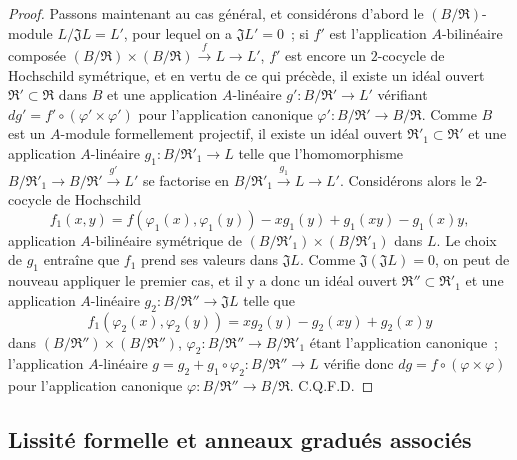 \begin{proof}
Passons maintenant au cas général, et considérons d'abord le
$(B/\mathfrak R)$-module $L/\mathfrak JL=L'$, pour lequel on a
$\mathfrak JL'=0$~; si $f'$ est l'application $A$-bilinéaire composée
$(B/\mathfrak R)\times(B/\mathfrak R)\xrightarrow{f}L\to L'$, $f'$ est
encore un $2$-cocycle de Hochschild symétrique, et en vertu de ce qui précède,
il existe un idéal ouvert $\mathfrak R'\subset\mathfrak R$ dans $B$ et
une application $A$-linéaire $g':B/\mathfrak R'\to L'$ vérifiant
$dg'=f'\circ(\varphi'\times\varphi')$ pour l'application canonique
$\varphi':B/\mathfrak R'\to B/\mathfrak R$. Comme $B$ est un
$A$-module formellement projectif, il existe un idéal ouvert
$\mathfrak R'_1\subset\mathfrak R'$ et une application $A$-linéaire
$g_1:B/\mathfrak R'_1\to L$ telle que l'homomorphisme
$B/\mathfrak R'_1\to B/\mathfrak R'\xrightarrow{g'}L'$ se factorise en
$B/\mathfrak R'_1\xrightarrow{g_1}L\to L'$. Considérons alors le
$2$-cocycle de Hochschild
\[
  f_1(x,y)=f(\varphi_1(x),\varphi_1(y))-xg_1(y)+g_1(xy)-g_1(x)y,
\]
application $A$-bilinéaire symétrique de
$(B/\mathfrak R'_1)\times(B/\mathfrak R'_1)$ dans $L$. Le choix de
$g_1$ entraîne que $f_1$ prend ses valeurs dans $\mathfrak JL$. Comme
$\mathfrak J(\mathfrak JL)=0$, on peut de nouveau appliquer le premier cas,
et il y a donc un idéal ouvert
$\mathfrak R''\subset\mathfrak R'_1$ et une application $A$-linéaire
$g_2:B/\mathfrak R''\to\mathfrak JL$ telle que
\[
  f_1(\varphi_2(x),\varphi_2(y))=xg_2(y)-g_2(xy)+g_2(x)y
\]
dans $(B/\mathfrak R'')\times(B/\mathfrak R'')$,
$\varphi_2:B/\mathfrak R''\to B/\mathfrak R'_1$ étant l'application
canonique~; l'application $A$-linéaire
$g=g_2+g_1\circ\varphi_2:B/\mathfrak R''\to L$ vérifie donc
$dg=f\circ(\varphi\times\varphi)$ pour l'application canonique
$\varphi:B/\mathfrak R''\to B/\mathfrak R$. C.Q.F.D.
\end{proof}

\subsection{Lissité formelle et anneaux gradués associés}
\label{subsection:0.19.5-fr}

